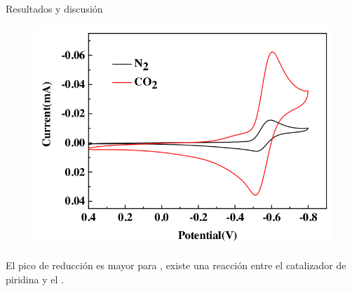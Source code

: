 \documentclass[handout]{beamer}
\begin{document}
\begin{frame}{Resultados y discusi\'on}
	\begin{figure}[h]
		\centering
		\includegraphics[width=0.7\linewidth]{sources/CO2N2}
	\end{figure}
	El pico de reducci\'on es mayor para , existe una reacci\'on entre el catalizador de piridina y el .
\end{frame}
\end{document}
